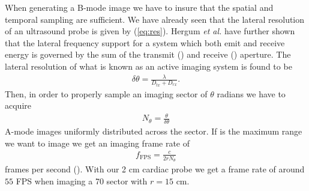 When generating a B-mode image we have to insure that the spatial and temporal sampling are sufficient. We have already seen that the lateral resolution of an ultrasound probe is given by (\ref{eq:res}).  Hergum \textit{et al.} \cite{Hergum2009} have further shown that the lateral frequency support for a system which both emit and receive energy is governed by the sum of the transmit () and receive () aperture. The lateral resolution of what is known as an active imaging system is found to be
\begin{align}
\delta\theta = \frac{\lambda}{D_{tx} + D_{rx}}.
\end{align}
Then, in order to properly sample an imaging sector of $\theta$ radians we have to acquire 
\begin{align}
N_\theta = \frac{\theta}{\delta\theta}
\end{align}
A-mode images uniformly distributed across the sector. If  is the maximum range we want to image we get an imaging frame rate of
\begin{align}
f_{\text{FPS}} = \frac{c}{2rN_\theta}
\end{align} 
frames per second (). With our 2 cm cardiac probe we get a frame rate of around $55$ FPS when imaging a 70\degree{} sector with $r=15$ cm.

